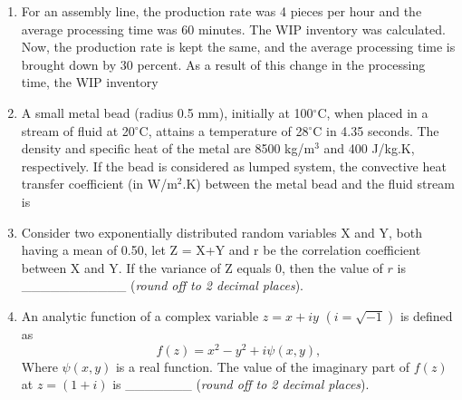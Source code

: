 \documentclass[12pt,onecolumn]{article}
\begin{document}
\begin{enumerate}
    \item For an assembly line, the production rate was 4 pieces per hour and the average processing time was 60 minutes. The WIP inventory was calculated. Now, the production rate is kept the same, and the average processing time is brought down by 30 percent. As a result of this change in the processing time, the WIP inventory
          \begin{enumerate}
          \end{enumerate}

    \item A small metal bead (radius 0.5 mm), initially at 100$^\circ$C, when placed in a stream of fluid at 20$^\circ$C, attains a temperature of 28$^\circ$C in 4.35 seconds. The density and specific heat of the metal are 8500 kg/m$^3$ and 400 J/kg.K, respectively. If the bead is considered as lumped system, the convective heat transfer coefficient (in W/m$^2$.K) between the metal bead and the fluid stream is
          \begin{enumerate}
          \end{enumerate}

    \item Consider two exponentially distributed random variables X and Y, both having a mean of 0.50, let Z = X+Y and r be the correlation coefficient between X and Y. If the variance of Z equals 0, then the value of $r$ is \_\_\_\_\_\_\_\_\_\_\_ (\textit{round off to 2 decimal places}).
    \item An analytic function of a complex variable $z=x + iy$ $(i = \sqrt{-1})$ is defined as
          \[
              f(z) = x^2 - y^2 + i\psi(x,y),
          \]
          Where $\psi(x,y)$ is a real function. The value of the imaginary part of $f(z)$ at $z=(1+i)$ is \_\_\_\_\_\_\_ (\textit{round off to 2 decimal places}).


\end{enumerate}
\end{document}
